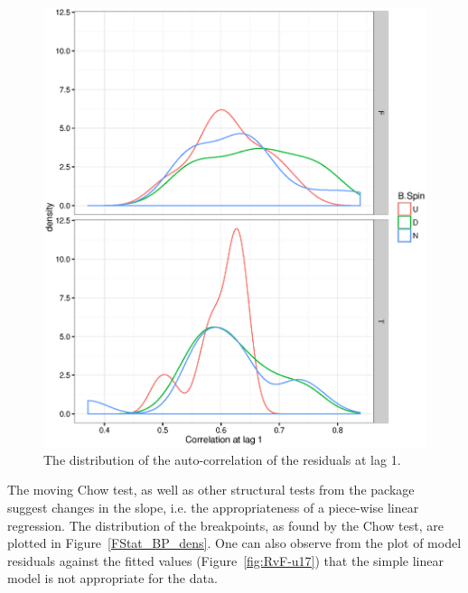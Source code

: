 \documentclass{report}
\begin{document}
\begin{figure}[H]
	\centering
	\includegraphics{ACF1_dens.eps}
	\caption{The distribution of the auto-correlation of the residuals at lag 1.\label{fig:DW2}}
\end{figure}

The moving Chow test, as well as other structural tests from the package~\cite{RStrucchange} suggest changes in the slope, i.e. the appropriateness of a piece-wise linear regression. The distribution of the breakpoints, as found by the Chow test, are plotted in Figure~\ref{FStat_BP_dens}. One can also observe from the plot of model residuals against the fitted values (Figure~\ref{fig:RvF-u17}) that the simple linear model is not appropriate for the data.
\end{document}
